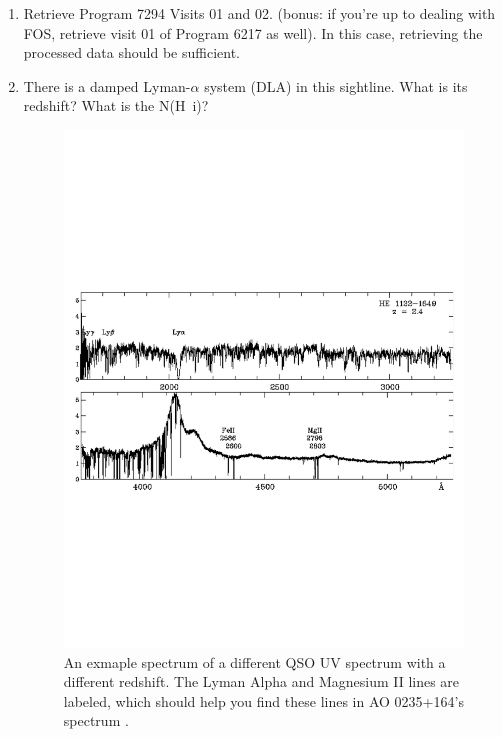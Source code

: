 \begin{enumerate}
	\item Retrieve Program 7294 Visits 01 and 02. (bonus: if you're up to dealing with FOS, retrieve visit 01 of 
		Program 6217 as well). In this case, retrieving the processed data should be sufficient.
	\item There is a damped Lyman-$\alpha$ system (DLA) in this sightline. What is its redshift? What is the 
		N(H~{\sc i})?
		\begin{center}

     		\begin{figure}[htbp]
		\begin{center}
                  \includegraphics[scale = 0.7, angle=0.0]{ex2_spectrum.pdf}
                  \caption[Fake Caption?]{An exmaple spectrum of a different QSO UV spectrum with a different redshift. The Lyman Alpha and Magnesium II lines are labeled, which should help you find these lines in AO 0235+164's spectrum \footnotemark.}
		\end{center}
		\end{figure}
		\end{center}


\end{enumerate}
